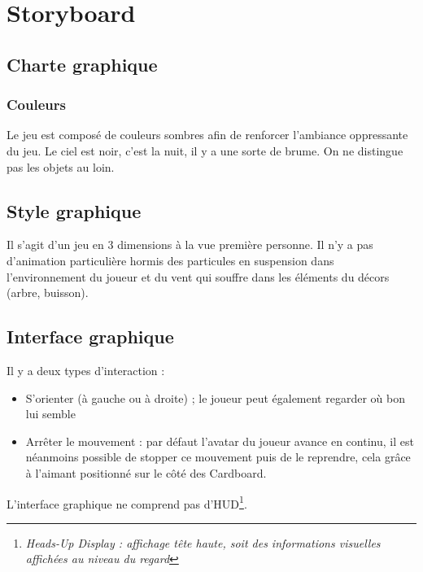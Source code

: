 \chapter{Storyboard}

\section{Charte graphique}

\subsection{Couleurs}

Le jeu est composé de couleurs sombres afin de renforcer l'ambiance oppressante du jeu. Le ciel est noir, c'est la nuit, il y a une sorte de brume. On ne distingue pas les objets au loin.

\section{Style graphique}

Il s'agit d'un jeu en 3 dimensions à la vue \og première personne\fg{}. Il n'y a pas d'animation particulière hormis des particules en suspension dans l'environnement du joueur et du vent qui souffre dans les éléments du décors (arbre, buisson).

\section{Interface graphique}

Il y a deux types d'interaction :
\begin{itemize}
  \item S'orienter (à gauche ou à droite) ; le joueur peut également regarder où bon lui semble
  \item Arrêter le mouvement : par défaut l'avatar du joueur avance en continu, il est néanmoins possible de stopper ce mouvement puis de le reprendre, cela grâce à l'aimant positionné sur le côté des Cardboard.
\end{itemize}

\medskip

\noindent L'interface graphique ne comprend pas d'HUD\footnote{\textit{Heads-Up Display : affichage tête haute, soit des informations visuelles affichées au niveau du regard}}.